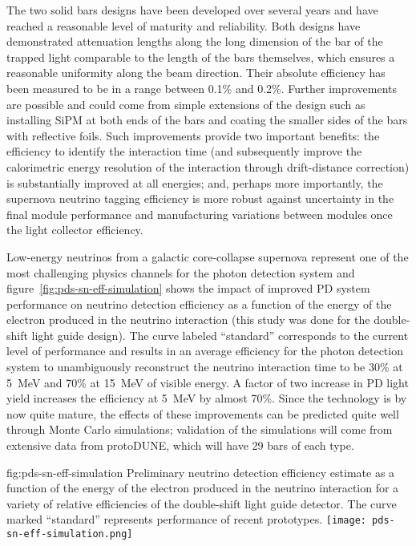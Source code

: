 The two solid bars designs have been developed over several years and have reached a reasonable level of maturity and reliability. 
Both designs have demonstrated attenuation lengths along the long dimension of the bar of the 
trapped light comparable to the length of the bars themselves, which ensures a reasonable uniformity along the beam direction. Their absolute efficiency has been measured to be in a range between 0.1\% and 0.2\%.
Further  improvements are possible and could come from simple extensions of the design such as installing SiPM at both ends of the bars and coating the smaller sides of the  bars with reflective foils. 
Such improvements provide two important benefits: the efficiency to identify the interaction time 
(and subsequently improve the calorimetric energy resolution of the interaction through drift-distance correction) is substantially improved at all energies; and, perhaps more importantly, the supernova neutrino tagging efficiency is more robust against uncertainty in the final module performance and manufacturing variations between modules once the light collector efficiency. 

Low-energy neutrinos from a galactic core-collapse supernova represent one of the most challenging physics channels for the photon detection system and figure~\ref{fig:pds-sn-eff-simulation} shows the impact of improved PD system performance on neutrino detection efficiency as a function of the energy of the electron produced in the neutrino interaction (this study was done for the double-shift light guide design).  The curve labeled ``standard'' corresponds to the current level of performance and results in an average efficiency for the photon detection system to unambiguously reconstruct the neutrino interaction time to be 30\% at 5~MeV and 70\% at 15~MeV of visible energy. A factor of two increase in PD light yield increases the efficiency at 5~MeV by almost 70\%. 
Since the technology is by now quite mature, the effects of these improvements can be predicted quite well through Monte Carlo simulations; validation of the simulations will come from extensive data from protoDUNE, which will have 29 bars of each type.

\begin{dunefigure}
{fig:pds-sn-eff-simulation}
{Preliminary neutrino detection efficiency estimate as a function of the energy of the electron produced in the neutrino interaction for a variety of relative efficiencies of the double-shift light guide detector. The curve marked ``standard'' represents performance of recent prototypes.} 
\texttt{[image: pds-sn-eff-simulation.png]}
\end{dunefigure}

